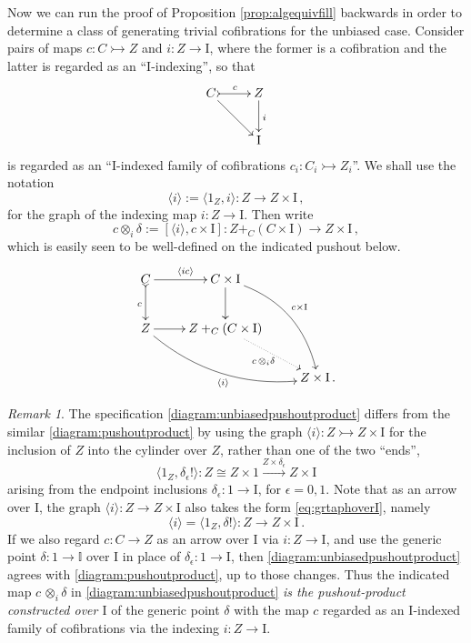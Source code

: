 \documentclass[11pt]{amsart}
\newcommand{\mono}{\ensuremath{\rightarrowtail}}
\newcommand{\ra}{\ensuremath{\rightarrow}}
\renewcommand{\to}{\ensuremath{\rightarrow}}
\newcommand{\too}{\ensuremath{\longrightarrow}}
\newcommand{\gph}[1]{\ensuremath{\langle #1 \rangle}}
\newcommand{\I}{\ensuremath{\mathrm{I}}}
\newcommand{\II}{\ensuremath{\mathbb{I}}}
\theoremstyle{remark}
\newtheorem{remark}[theorem]{Remark}
\theoremstyle{definition}
\begin{document}
Now we can run the proof of Proposition \ref{prop:algequivfill} backwards in order to determine a class of generating trivial cofibrations for the unbiased case. Consider pairs of maps $c : C\mono Z$ and $i:Z\ra\I$, where the former is a cofibration and the latter is regarded as an ``$\I$-indexing'', so that
\[
\xymatrix{
C \ar[rd] \ar@{>->}[r]^{c} & Z  \ar[d]^i \\
& \I
}
\]
is regarded as an ``$\I$-indexed family of cofibrations $c_i : C_i \mono Z_i$''.  We shall use the notation
\begin{equation}\label{eq:graphdef}
\gph{i} := \langle 1_Z, i\rangle : Z\too Z\times\I\,,
\end{equation}
for the graph of the indexing map $i : Z\ra \I$. Then write
\[
c \otimes_i\!\delta := [\gph{i}, c\times\I] : Z+_C(C\times\I) \too Z\times \I\,,
\]
which is easily seen to be well-defined on the indicated pushout below.
\begin{equation}\label{diagram:unbiasedpushoutproduct}
\xymatrix{
C \ar@{>->}[d]_{c} \ar[r]^{\gph{ic}} & C\times \I \ar[d] \ar@/^4ex/ [rdd]^{c\times\I}\\
Z \ar@/_4ex/ [rrd]_{\gph{i}} \ar[r] &  Z +_C (C\times\I) \ar@{.>}[rd]_{c\, \otimes_i \delta} \\
&& Z\times\I\,.
}
\end{equation}

\begin{remark}\label{rem:poprodoverI}
The specification \eqref{diagram:unbiasedpushoutproduct} differs from the similar \eqref{diagram:pushoutproduct} by using the graph $\gph{i} : Z\mono Z\times\I$ for the inclusion of $Z$ into the cylinder over $Z$, rather than one of the two ``ends'',
\begin{equation}\label{eq:grtaphoverI}
\gph{1_Z , \delta_\epsilon !}  : Z\cong Z\times 1 \stackrel{Z\times \delta_\epsilon}{\longrightarrow} Z\times\I
\end{equation}
arising from the endpoint inclusions $\delta_\epsilon : 1\ra\I$, for $\epsilon = 0,1$.   Note that as an arrow over $\I$,  the graph $\gph{i} : Z\to Z\times\I$ also takes the form \eqref{eq:grtaphoverI}, namely
\[
\gph{i} = \gph{1_Z , \delta !} : Z\to Z\times \I\,.
\]
If we also regard $c : C\to Z$ as an arrow over $\I$ via $i : Z\to\I$, and use the generic point $\delta : 1 \to \II$ over $\I$ in place of $\delta_\epsilon : 1 \to \I$, then  \eqref{diagram:unbiasedpushoutproduct}  agrees with  \eqref{diagram:pushoutproduct}, up to those changes.  Thus the indicated map ${c\, \otimes_i \delta}$ in  \eqref{diagram:unbiasedpushoutproduct} \emph{is the pushout-product constructed over $\I$} of the generic point $\delta$ with the map $c$ regarded as an $\I$-indexed family of cofibrations via the indexing $i : Z \to \I$.
\end{remark}
\end{document}
